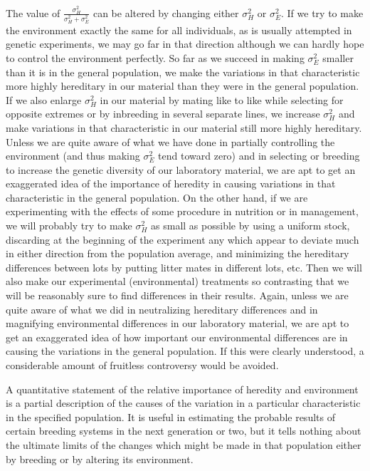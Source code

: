 The value of $\frac{\sigma_H^2}{\sigma_H^2 + \sigma_E^2}$ can be altered by
changing either $\sigma_H^2$ or $\sigma_E^2$. If we try to make the environment
exactly the same for all individuals, as is usually attempted in genetic experiments,
we may go far in that direction although we can hardly hope to control the environment
perfectly. So far as we succeed in making $\sigma_E^2$ smaller than it is in the
general population, we make the variations in that characteristic more
highly hereditary in our material than they were in the general population.
If we also enlarge $\sigma_H^2$ in our material by mating like to like while
selecting for opposite extremes or by inbreeding in several separate
lines, we increase $\sigma_H^2$ and make variations in that characteristic in our
material still more highly hereditary. Unless we are quite aware of what
we have done in partially controlling the environment (and thus making
$\sigma_E^2$ tend toward zero) and in selecting or breeding to increase the
genetic diversity of our laboratory material, we are apt to get an
exaggerated idea of the importance of heredity in causing variations in that
characteristic in the general population. On the other hand, if we are
experimenting with the effects of some procedure in nutrition or in
management, we will probably try to make $\sigma_H^2$ as small as possible by
using a uniform stock, discarding at the beginning of the experiment
any which appear to deviate much in either direction from the population
average, and minimizing the hereditary differences between lots by
putting litter mates in different lots, etc. Then we will also make our
experimental (environmental) treatments so contrasting that we will be
reasonably sure to find differences in their results. Again, unless we are
quite aware of what we did in neutralizing hereditary differences and in
magnifying environmental differences in our laboratory material, we
are apt to get an exaggerated idea of how important our environmental
differences are in causing the variations in the general population. If
this were clearly understood, a considerable amount of fruitless controversy
would be avoided.

A quantitative statement of the relative importance of heredity and
environment is a partial description of the causes of the variation in a
particular characteristic in the specified population. It is useful in estimating
the probable results of certain breeding systems in the next
generation or two, but it tells nothing about the ultimate limits of the
changes which might be made in that population either by breeding or
by altering its environment.

